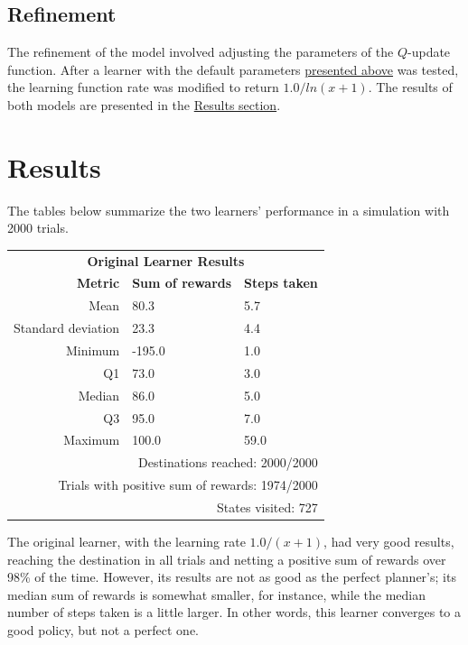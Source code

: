 \documentclass{article}
\begin{document}
\subsection{Refinement}

The refinement of the model involved adjusting the parameters of the $Q$-update function. After a learner with the default parameters  \hyperref[subsec:basic]{presented above} was tested, the learning function rate was modified to return $1.0 / ln(x + 1)$. The results of both models are presented in the \hyperref[sec:results]{Results section}.

\section{Results}
\label{sec:results}

The tables below summarize the two learners' performance in a simulation with 2000 trials.

\begin{center}
   \begin{tabular}{rll}
        \multicolumn{3}{c}{\textbf{Original Learner Results}} \\
        \textbf{Metric}    & \textbf{Sum of rewards}    &\textbf{Steps taken}\\
        Mean               & 80.3                       & 5.7\\
        Standard deviation & 23.3                       & 4.4\\
        Minimum            & -195.0                     & 1.0\\
        Q1                 & 73.0                       & 3.0\\
        Median             & 86.0                       & 5.0\\
        Q3                 & 95.0                       & 7.0\\
        Maximum            & 100.0                      & 59.0\\
        \multicolumn{3}{r}{Destinations reached: 2000/2000}\\
        \multicolumn{3}{r}{Trials with positive sum of rewards: 1974/2000}\\
        \multicolumn{3}{r}{States visited: 727}\\
    \end{tabular}
\end{center}

The original learner, with the learning rate $1.0 / (x + 1)$, had very good results, reaching the destination in all trials and netting a positive sum of rewards over 98\% of the time. However, its results are not as good as the perfect planner's; its median sum of rewards is somewhat smaller, for instance, while the median number of steps taken is a little larger. In other words, this learner converges to a good policy, but not a perfect one.
\end{document}
